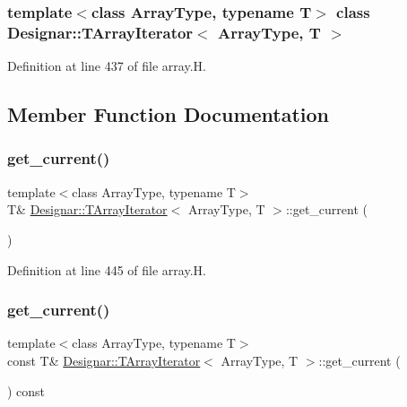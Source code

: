 \subsubsection*{template$<$class Array\+Type, typename T$>$\newline
class Designar\+::\+T\+Array\+Iterator$<$ Array\+Type, T $>$}



Definition at line 437 of file array.\+H.



\subsection{Member Function Documentation}
\mbox{\label{class_designar_1_1_t_array_iterator_a1d627df3d5e97047d904e743ccab0731}} 
\subsubsection{\texorpdfstring{get\+\_\+current()}{get\_current()}\hspace{0.1cm}{\footnotesize\ttfamily [1/2]}}
{\footnotesize\ttfamily template$<$class Array\+Type, typename T$>$ \\
T\& \hyperlink{class_designar_1_1_t_array_iterator}{Designar\+::\+T\+Array\+Iterator}$<$ Array\+Type, T $>$\+::get\+\_\+current (\begin{DoxyParamCaption}{ }\end{DoxyParamCaption})\hspace{0.3cm}{\ttfamily [inline]}}



Definition at line 445 of file array.\+H.

\mbox{\label{class_designar_1_1_t_array_iterator_ab7f3127bd70958a362a18f91a199a72b}} 
\subsubsection{\texorpdfstring{get\+\_\+current()}{get\_current()}\hspace{0.1cm}{\footnotesize\ttfamily [2/2]}}
{\footnotesize\ttfamily template$<$class Array\+Type, typename T$>$ \\
const T\& \hyperlink{class_designar_1_1_t_array_iterator}{Designar\+::\+T\+Array\+Iterator}$<$ Array\+Type, T $>$\+::get\+\_\+current (\begin{DoxyParamCaption}{ }\end{DoxyParamCaption}) const\hspace{0.3cm}{\ttfamily [inline]}}



